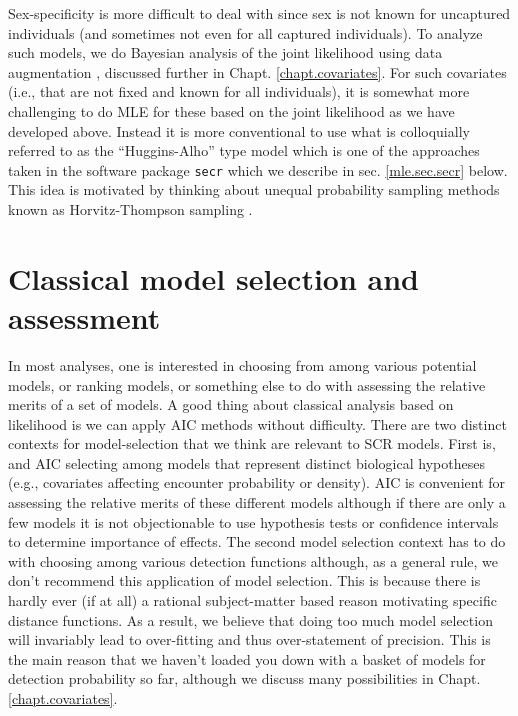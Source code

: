 Sex-specificity is more difficult to deal with since sex is not known
for uncaptured individuals (and sometimes not even for all captured
individuals).  To analyze such models, we do Bayesian analysis of the
joint likelihood using  data augmentation
\citep{gardner_etal:2010jwm,russell_etal:2012}, discussed further in
Chapt. \ref{chapt.covariates}. For such covariates (i.e., that are
not fixed and known for all individuals), it is somewhat more
challenging to do MLE for these based on the joint likelihood as we
have developed above. Instead it is more conventional to use what is
colloquially referred to as the ``Huggins-Alho'' type model which is
one of the approaches taken in the software package \mbox{\tt secr}
\citep[][]{efford:2011} which we describe
in sec. \ref{mle.sec.secr} below. This idea is
motivated by thinking about unequal probability sampling methods known
as Horvitz-Thompson sampling \citep[e.g.,
see][]{overton_stehman:1995}.  



\section{Classical model selection and assessment}

In most analyses, one is interested in choosing from among various
potential models, or ranking models, or something else to do with
assessing the relative merits of a set of models. A good thing about
classical analysis based on likelihood is we can apply AIC methods
\citep{burnham_anderson:2002} without difficulty. There are two
distinct contexts for model-selection that we think are relevant to
SCR models. First is, and AIC selecting among models that represent
distinct biological hypotheses (e.g., covariates affecting encounter
probability or density). AIC is convenient for assessing the relative
merits of these different models although if there are only a few
models it is not objectionable to use hypothesis tests or confidence
intervals to determine importance of effects. The second model
selection context has to do with choosing among various detection
functions although, as a general rule, we don't recommend this
application of model selection.  This is because there is hardly ever
(if at all) a rational subject-matter based reason motivating specific
distance functions. As a result, we believe that doing too much model
selection will invariably lead to over-fitting and thus over-statement
of precision. This is the main reason that we haven't loaded you down
with a basket of models for detection probability so far, although we
discuss many possibilities in Chapt. \ref{chapt.covariates}.


